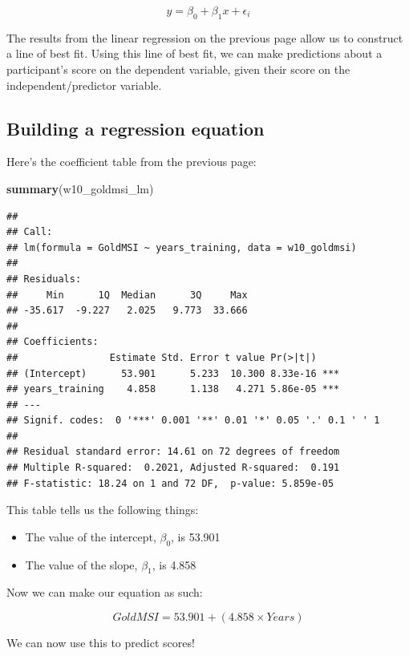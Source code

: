 \documentclass[
]{book}
\newenvironment{Shaded}{\begin{snugshade}}{\end{snugshade}}
\newcommand{\FunctionTok}[1]{\textcolor[rgb]{0.13,0.29,0.53}{\textbf{#1}}}
\newcommand{\NormalTok}[1]{#1}
\providecommand{\tightlist}{%
  \setlength{\itemsep}{0pt}\setlength{\parskip}{0pt}}
\begin{document}
\[
y = \beta_0 + \beta_1x + \epsilon_i
\]

The results from the linear regression on the previous page allow us to construct a line of best fit. Using this line of best fit, we can make predictions about a participant's score on the dependent variable, given their score on the independent/predictor variable.

\hypertarget{building-a-regression-equation}{%
\subsection{Building a regression equation}\label{building-a-regression-equation}}

Here's the coefficient table from the previous page:

\begin{Shaded}
\begin{Highlighting}[]
\FunctionTok{summary}\NormalTok{(w10\_goldmsi\_lm)}
\end{Highlighting}
\end{Shaded}

\begin{verbatim}
## 
## Call:
## lm(formula = GoldMSI ~ years_training, data = w10_goldmsi)
## 
## Residuals:
##     Min      1Q  Median      3Q     Max 
## -35.617  -9.227   2.025   9.773  33.666 
## 
## Coefficients:
##                Estimate Std. Error t value Pr(>|t|)    
## (Intercept)      53.901      5.233  10.300 8.33e-16 ***
## years_training    4.858      1.138   4.271 5.86e-05 ***
## ---
## Signif. codes:  0 '***' 0.001 '**' 0.01 '*' 0.05 '.' 0.1 ' ' 1
## 
## Residual standard error: 14.61 on 72 degrees of freedom
## Multiple R-squared:  0.2021, Adjusted R-squared:  0.191 
## F-statistic: 18.24 on 1 and 72 DF,  p-value: 5.859e-05
\end{verbatim}

This table tells us the following things:

\begin{itemize}
\tightlist
\item
  The value of the intercept, \(\beta_0\), is 53.901
\item
  The value of the slope, \(\beta_1\), is 4.858
\end{itemize}

Now we can make our equation as such:

\[
GoldMSI = 53.901 + (4.858 \times Years)
\]

We can now use this to predict scores!
\end{document}
